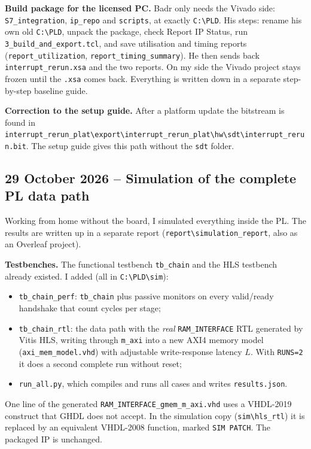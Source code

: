 \documentclass[11pt,a4paper]{article}
\newcommand{\code}[1]{\texttt{#1}}
\begin{document}
\textbf{Build package for the licensed PC.} Badr only needs the Vivado side: \code{S7\_integration}, \code{ip\_repo} and \code{scripts}, at exactly \code{C:\textbackslash PLD}. His steps: rename his own old \code{C:\textbackslash PLD}, unpack the package, check Report IP Status, run \code{3\_build\_and\_export.tcl}, and save utilisation and timing reports (\code{report\_utilization}, \code{report\_timing\_summary}). He then sends back \code{interrupt\_rerun.xsa} and the two reports. On my side the Vivado project stays frozen until the \code{.xsa} comes back. Everything is written down in a separate step-by-step baseline guide.

\textbf{Correction to the setup guide.} After a platform update the bitstream is found in \code{interrupt\_rerun\_plat\textbackslash export\textbackslash}\allowbreak\code{interrupt\_rerun\_plat\textbackslash hw\textbackslash sdt\textbackslash}\allowbreak\code{interrupt\_rerun.bit}. The setup guide gives this path without the \code{sdt} folder.

\subsection{29 October 2026 -- Simulation of the complete PL data path}
Working from home without the board, I simulated everything inside the PL. The results are written up in a separate report (\code{report\textbackslash simulation\_report}, also as an Overleaf project).

\textbf{Testbenches.} The functional testbench \code{tb\_chain} and the HLS testbench already existed. I added (all in \code{C:\textbackslash PLD\textbackslash sim}):
\begin{itemize}[noitemsep]
  \item \code{tb\_chain\_perf}: \code{tb\_chain} plus passive monitors on every valid/ready handshake that count cycles per stage;
  \item \code{tb\_chain\_rtl}: the data path with the \emph{real} \code{RAM\_INTERFACE} RTL generated by Vitis HLS, writing through \code{m\_axi} into a new AXI4 memory model (\code{axi\_mem\_model.vhd}) with adjustable write-response latency $L$. With \code{RUNS=2} it does a second complete run without reset;
  \item \code{run\_all.py}, which compiles and runs all cases and writes \code{results.json}.
\end{itemize}
One line of the generated \code{RAM\_INTERFACE\_gmem\_m\_axi.vhd} uses a VHDL-2019 construct that GHDL does not accept. In the simulation copy (\code{sim\textbackslash hls\_rtl}) it is replaced by an equivalent VHDL-2008 function, marked \code{SIM PATCH}. The packaged IP is unchanged.
\end{document}
